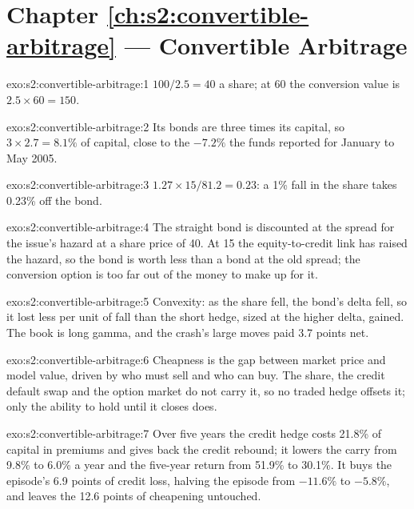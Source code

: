 \section*{Chapter \ref{ch:s2:convertible-arbitrage} --- Convertible Arbitrage}

\begin{solution}{exo:s2:convertible-arbitrage:1}
$100/2.5 = 40$ a share; at 60 the conversion value is $2.5 \times 60 = 150$.
\end{solution}

\begin{solution}{exo:s2:convertible-arbitrage:2}
Its bonds are three times its capital, so $3 \times 2.7 = 8.1\%$ of capital, close to the $-7.2\%$ the funds reported for January to May 2005.
\end{solution}

\begin{solution}{exo:s2:convertible-arbitrage:3}
$1.27 \times 15/81.2 = 0.23$: a 1\% fall in the share takes 0.23\% off the bond.
\end{solution}

\begin{solution}{exo:s2:convertible-arbitrage:4}
The straight bond is discounted at the spread for the issue's hazard at a share price of 40. At 15 the equity-to-credit link has raised the hazard,
so the bond is worth less than a bond at the old spread; the conversion option is too far out of the money to make up for it.
\end{solution}

\begin{solution}{exo:s2:convertible-arbitrage:5}
Convexity: as the share fell, the bond's delta fell, so it lost less per unit of fall than the short hedge, sized at the higher delta, gained. The book
is long gamma, and the crash's large moves paid 3.7 points net.
\end{solution}

\begin{solution}{exo:s2:convertible-arbitrage:6}
Cheapness is the gap between market price and model value, driven by who must sell and who can buy. The share, the credit default swap and the
option market do not carry it, so no traded hedge offsets it; only the ability to hold until it closes does.
\end{solution}

\begin{solution}{exo:s2:convertible-arbitrage:7}
Over five years the credit hedge costs 21.8\% of capital in premiums and gives back the credit rebound; it lowers the carry from 9.8\% to 6.0\% a
year and the five-year return from 51.9\% to 30.1\%. It buys the episode's 6.9 points of credit loss, halving the episode from $-11.6\%$ to
$-5.8\%$, and leaves the 12.6 points of cheapening untouched.
\end{solution}

